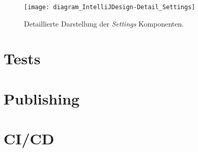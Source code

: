 \begin{figure}
    \centering
    \texttt{[image: diagram\_IntelliJDesign-Detail\_Settings]}
    \caption{Detaillierte Darstellung der \emph{Settings} Komponenten.}
    \label{fig:diagram_IntelliJDesign-Detail_Settings}
\end{figure}

\section{Tests}
\label{sec:EntwicklungIntelliJ_Tests}

\section{Publishing}
\label{sec:EntwicklungIntelliJ_Publishing}

\section{CI/CD}
\label{sec:EntwicklungIntelliJ_CICD}